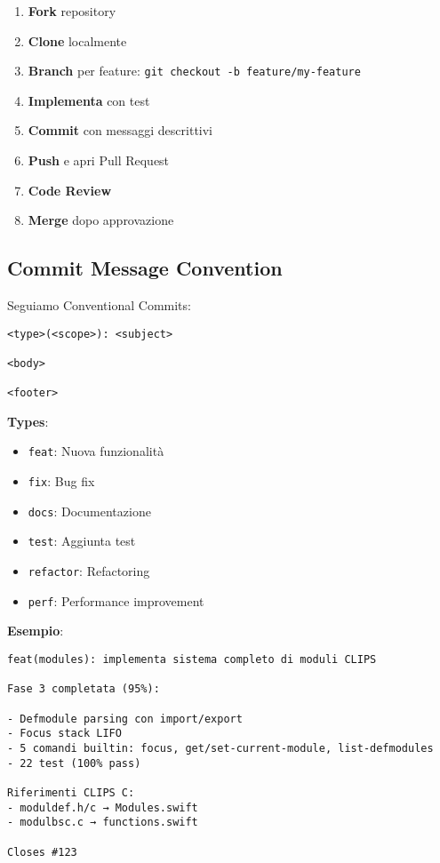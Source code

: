 \begin{enumerate}
\item \textbf{Fork} repository
\item \textbf{Clone} localmente
\item \textbf{Branch} per feature: \texttt{git checkout -b feature/my-feature}
\item \textbf{Implementa} con test
\item \textbf{Commit} con messaggi descrittivi
\item \textbf{Push} e apri Pull Request
\item \textbf{Code Review}
\item \textbf{Merge} dopo approvazione
\end{enumerate}

\subsection{Commit Message Convention}

Seguiamo Conventional Commits:

\begin{verbatim}
<type>(<scope>): <subject>

<body>

<footer>
\end{verbatim}

\textbf{Types}:
\begin{itemize}
\item \texttt{feat}: Nuova funzionalità
\item \texttt{fix}: Bug fix
\item \texttt{docs}: Documentazione
\item \texttt{test}: Aggiunta test
\item \texttt{refactor}: Refactoring
\item \texttt{perf}: Performance improvement
\end{itemize}

\textbf{Esempio}:
\begin{verbatim}
feat(modules): implementa sistema completo di moduli CLIPS

Fase 3 completata (95%):

- Defmodule parsing con import/export
- Focus stack LIFO
- 5 comandi builtin: focus, get/set-current-module, list-defmodules
- 22 test (100% pass)

Riferimenti CLIPS C:
- moduldef.h/c → Modules.swift
- modulbsc.c → functions.swift

Closes #123
\end{verbatim}

